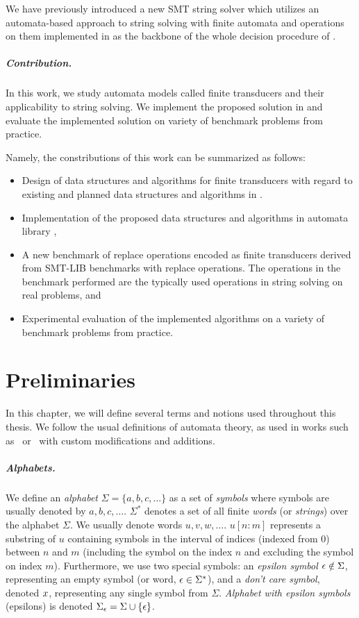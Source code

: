 We have previously introduced a new SMT string solver \noodler which utilizes an automata-based approach to string solving with finite automata and operations on them implemented in \mata as the backbone of the whole decision procedure of \noodler.

\paragraph{Contribution.}
In this work, we study automata models called finite transducers and their applicability to string solving. We implement the proposed solution in \mata and evaluate the implemented solution on variety of benchmark problems from practice.

Namely, the constributions of this work can be summarized as follows:
\begin{itemize}
  \item Design of data structures and algorithms for finite transducers with regard to existing and planned data structures and algorithms in \mata.
  \item Implementation of the proposed data structures and algorithms in automata library \mata,
  \item A new benchmark of replace operations encoded as finite transducers derived from SMT-LIB benchmarks with replace operations. The operations in the benchmark performed are the typically used operations in string solving on real problems, and
  \item Experimental evaluation of the implemented algorithms on a variety of benchmark problems from practice.
\end{itemize}

\chapter{Preliminaries}
\label{sec:Preliminaries}
In this chapter, we will define several terms and notions used throughout this thesis.
We follow the usual definitions of automata theory, as used in works such as~\cite{Esparza} or~\cite{Sipser} with custom modifications and additions.

\paragraph{Alphabets.}
We define an \emph{alphabet} $\Sigma = \{ a, b, c, \ldots \}$ as a set of \emph{symbols} where
symbols are usually denoted by $a, b, c, \ldots$.
$\Sigma^*$ denotes a set of all finite \emph{words} (or \emph{strings}) over the alphabet $\Sigma$.
We usually denote words $u, v, w, \ldots$.
$u[n:m]$ represents a substring of $u$ containing symbols in the interval of indices (indexed from 0) between $n$ and $m$ (including the symbol on the index $n$ and excluding the symbol on index $m$).
Furthermore, we use two special symbols: an \emph{epsilon symbol} $\epsilon \notin \Sigma$, representing an empty symbol (or word, $\epsilon \in \Sigma^*$), and a \emph{don't care symbol}, denoted $x$, representing any single symbol from $\Sigma$.
\emph{Alphabet with epsilon symbols} (epsilons) is denoted $\Sigma_\epsilon = \Sigma \cup \{ \epsilon \}$.

